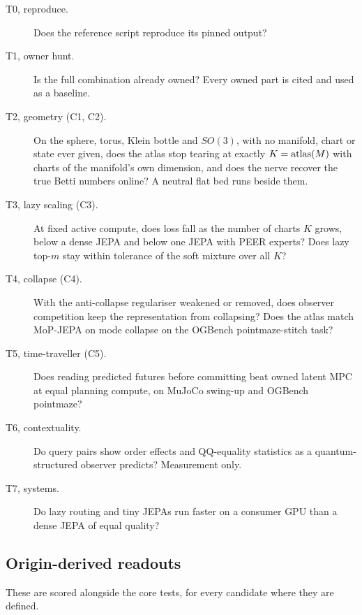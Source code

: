 \begin{description}
  \item[T0, reproduce.] Does the reference script reproduce its pinned output?
  \item[T1, owner hunt.] Is the full combination already owned? Every owned part is cited and used as a baseline.
  \item[T2, geometry (C1, C2).] On the sphere, torus, Klein bottle and $SO(3)$, with no manifold, chart or state ever given, does the atlas stop tearing at exactly $K=\operatorname{atlas}(M)$ with charts of the manifold's own dimension, and does the nerve recover the true Betti numbers online? A neutral flat bed runs beside them.
  \item[T3, lazy scaling (C3).] At fixed active compute, does loss fall as the number of charts $K$ grows, below a dense JEPA and below one JEPA with PEER experts? Does lazy top-$m$ stay within tolerance of the soft mixture over all $K$?
  \item[T4, collapse (C4).] With the anti-collapse regulariser weakened or removed, does observer competition keep the representation from collapsing? Does the atlas match MoP-JEPA on mode collapse on the OGBench pointmaze-stitch task?
  \item[T5, time-traveller (C5).] Does reading predicted futures before committing beat owned latent MPC at equal planning compute, on MuJoCo swing-up and OGBench pointmaze?
  \item[T6, contextuality.] Do query pairs show order effects and QQ-equality statistics as a quantum-structured observer predicts? Measurement only.
  \item[T7, systems.] Do lazy routing and tiny JEPAs run faster on a consumer GPU than a dense JEPA of equal quality?
\end{description}

\subsection{Origin-derived readouts}

These are scored alongside the core tests, for every candidate where they are defined.

